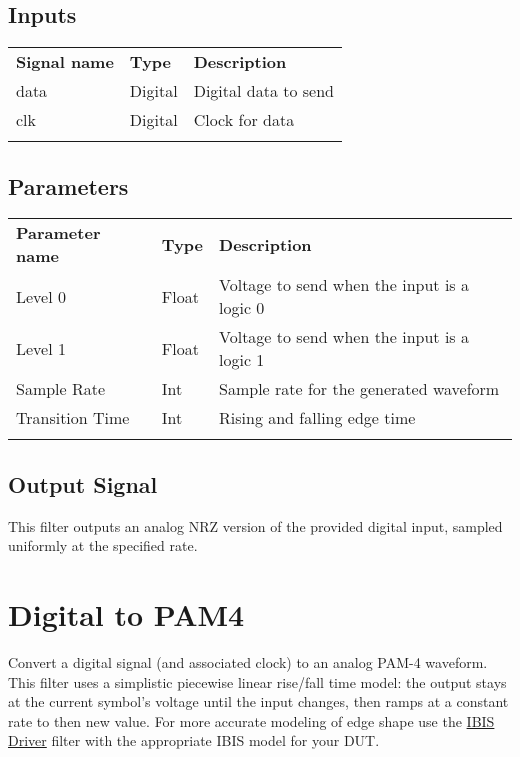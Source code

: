 \subsection{Inputs}

\begin{tabularx}{16cm}{llX}
\thickhline
\textbf{Signal name} & \textbf{Type} & \textbf{Description} \\
\thickhline
data & Digital & Digital data to send\\
\thinhline
clk & Digital & Clock for data\\
\thickhline
\end{tabularx}

\subsection{Parameters}

\begin{tabularx}{16cm}{llX}
\thickhline
\textbf{Parameter name} & \textbf{Type} & \textbf{Description} \\
\thickhline
Level 0 & Float & Voltage to send when the input is a logic 0\\
\thinhline
Level 1 & Float & Voltage to send when the input is a logic 1\\
\thinhline
Sample Rate & Int & Sample rate for the generated waveform\\
\thinhline
Transition Time & Int & Rising and falling edge time\\
\thickhline
\end{tabularx}

\subsection{Output Signal}

This filter outputs an analog NRZ version of the provided digital input, sampled uniformly at the specified rate.

\pagebreak
\section{Digital to PAM4}
\label{filter:digitaltopam4}

Convert a digital signal (and associated clock) to an analog PAM-4 waveform. This filter uses a simplistic piecewise
linear rise/fall time model: the output stays at the current symbol's voltage until the input changes, then ramps at a
constant rate to then new value. For more accurate modeling of edge shape use the \hyperref[filter:ibisdriver]{IBIS
Driver} filter with the appropriate IBIS model for your DUT.


